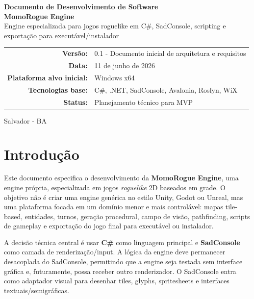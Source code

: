 \documentclass[12pt,a4paper]{article}
\begin{document}
\begin{titlepage}
    \centering
    \vspace*{2.0cm}
    {\Huge\bfseries Documento de Desenvolvimento de Software\\[0.3cm]}
    {\LARGE\bfseries MomoRogue Engine\\[0.4cm]}
    {\large Engine especializada para jogos roguelike em C\#, SadConsole, scripting e exportação para executável/instalador\\[1.5cm]}
    \vfill
    \begin{tabular}{rl}
        \textbf{Versão:} & 0.1 - Documento inicial de arquitetura e requisitos \\
        \textbf{Data:} & 11 de junho de 2026 \\
        \textbf{Plataforma alvo inicial:} & Windows x64 \\
        \textbf{Tecnologias base:} & C\#, .NET, SadConsole, Avalonia, Roslyn, WiX \\
        \textbf{Status:} & Planejamento técnico para MVP \\
    \end{tabular}
    \vfill
    {\large Salvador - BA\\}
\end{titlepage}

\tableofcontents
\newpage

\section{Introdução}

Este documento especifica o desenvolvimento da \textbf{MomoRogue Engine}, uma engine própria, especializada em jogos \textit{roguelike} 2D baseados em grade. O objetivo não é criar uma engine genérica no estilo Unity, Godot ou Unreal, mas uma plataforma focada em um domínio menor e mais controlável: mapas tile-based, entidades, turnos, geração procedural, campo de visão, pathfinding, scripts de gameplay e exportação do jogo final para executável ou instalador.

A decisão técnica central é usar \textbf{C\#} como linguagem principal e \textbf{SadConsole} como camada de renderização/input. A lógica da engine deve permanecer desacoplada do SadConsole, permitindo que a engine seja testada sem interface gráfica e, futuramente, possa receber outro renderizador. O SadConsole entra como adaptador visual para desenhar tiles, glyphs, spritesheets e interfaces textuais/semigráficas.
\end{document}
